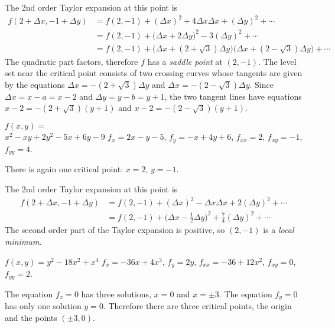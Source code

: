 \begin{multicols}{2}
The 2nd order Taylor expansion at this point is 
\begin{align*}
f(2+\Delta x, -1+\Delta y)
&= f(2, -1) + (\Delta x)^2 + 4 \Delta x \Delta x
            + (\Delta y)^2 +\cdots\\
&= f(2, -1) + \bigl(\Delta x+2\Delta y\bigr)^{2}
            - 3(\Delta y)^2+\cdots\\
&= f(2, -1) + \bigl(\Delta x+(2+\surd3)\Delta y\bigr)
              \bigl(\Delta x+(2-\surd3)\Delta y\bigr)
            +\cdots
\end{align*}
%
The quadratic part factors, therefore $f$ has a
\emph{saddle point} at $(2, -1)$.  The level set near the critical
point consists of two crossing curves whose tangents are given by the
equations $\Delta x=-(2+\surd 3)\Delta y$ and $\Delta x=-(2-\surd
3)\Delta y$.  Since $\Delta x=x-a=x-2$ and $\Delta y = y-b = y+1$, the
two tangent lines have equations $x-2 = -(2+\surd3)(y+1)$ and
$x-2 = -(2-\surd3)(y+1)$.
\endanswer

\subprob  $f(x,y)=$\\
\null\hfill$x^2-xy+2y^2-5x+6y-9$ 
\label{prb:find-cpt-02}
\answer 
$f_x = 2x-y-5$, $f_y = -x+4y+6$, $f_{xx} = 2$, $f_{xy}=-1$, $f_{yy}=4$.

There is again one critical point: $x=2$, $y=-1$.

The 2nd order Taylor expansion at this point is 
\begin{align*}
f(2+\Delta x, -1+\Delta y)
&= f(2, -1) + (\Delta x)^2 - \Delta x \Delta x
            + 2(\Delta y)^2 +\cdots\\
&= f(2, -1) + \bigl(\Delta x-\tfrac12\Delta y\bigr)^{2}
            +\tfrac74(\Delta y)^2+\cdots
\end{align*}
The second order part of the Taylor expansion is positive, so
$(2, -1)$ is a \emph{local minimum}.

\endanswer

\subprob $f(x,y) = y^2-18 x^2+x^4$ 
\answer   
$f_x = -36x+4x^3$, $f_y = 2y$, $f_{xx} = -36+12x^2$, $f_{xy}=0$,
$f_{yy}=2$.

The equation $f_x=0$ has three solutions, $x=0$ and $x=\pm3$.
The equation $f_y=0$ has only one solution $y=0$.
Therefore there are three critical points, the origin and the points
$(\pm 3,0)$.


\end{multicols}

